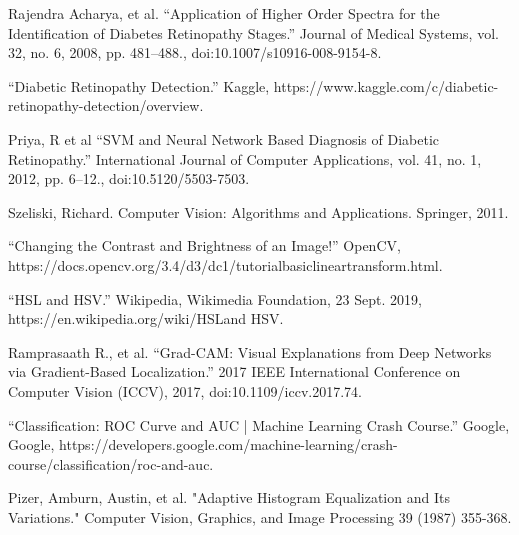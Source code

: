 \begin{thebibliography}{99}
 Rajendra Acharya, et al. “Application of Higher Order Spectra for the Identification of Diabetes Retinopathy Stages.” Journal of Medical Systems, vol. 32, no. 6, 2008, pp. 481–488., doi:10.1007/s10916-008-9154-8.

 “Diabetic Retinopathy Detection.” Kaggle, https://www.kaggle.com/c/diabetic-retinopathy-detection/overview.

Priya, R et al “SVM and Neural Network Based Diagnosis of Diabetic Retinopathy.” International Journal of Computer Applications, vol. 41, no. 1, 2012, pp. 6–12., doi:10.5120/5503-7503.

 Szeliski, Richard. Computer Vision: Algorithms and Applications. Springer, 2011.

 “Changing the Contrast and Brightness of an Image!” OpenCV, https://docs.opencv.org/3.4/d3/dc1/tutorial\textunderscore basic\textunderscore linear\textunderscore transform.html.

 “HSL and HSV.” Wikipedia, Wikimedia Foundation, 23 Sept. 2019, https://en.wikipedia.org/wiki/HSL\textunderscore and \textunderscore HSV.

 Ramprasaath R., et al. “Grad-CAM: Visual Explanations from Deep Networks via Gradient-Based Localization.” 2017 IEEE International Conference on Computer Vision (ICCV), 2017, doi:10.1109/iccv.2017.74.

 “Classification: ROC Curve and AUC  |  Machine Learning Crash Course.” Google, Google, https://developers.google.com/machine-learning/crash-course/classification/roc-and-auc.

 Pizer, Amburn, Austin, et al. "Adaptive Histogram Equalization and Its Variations." Computer Vision, Graphics, and Image Processing 39 (1987) 355-368.


\end{thebibliography}

